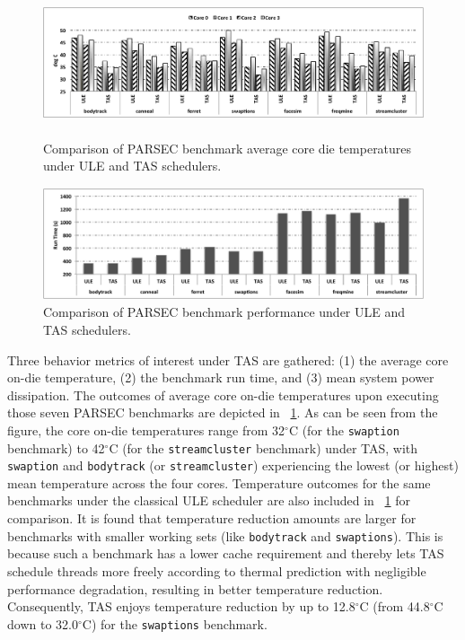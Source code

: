\documentclass[times, 10pt,twocolumn]{IEEEtran}
\begin{document}
\begin{figure}[tbp] 
\centering
  \includegraphics[width=1.0\linewidth,height=1.7in]{graphics/parsectemp}
  \caption{Comparison of PARSEC benchmark average core die temperatures
under ULE and TAS schedulers.}
  \label{fig:pbenchmarkt}
\end{figure}
\begin{figure}[tbp]
  \includegraphics[width=1.0\linewidth,height=1.3in]{graphics/parsecperformance}
  \caption{Comparison of PARSEC benchmark performance under ULE and TAS
schedulers.}
  \label{fig:pbenchmarkp}
\end{figure} 
Three behavior metrics of interest under TAS are gathered: (1) the
average core on-die temperature, (2) the benchmark run time, and (3)
mean system power dissipation.  The outcomes of average core on-die
temperatures upon executing those seven PARSEC benchmarks are depicted
in \figurename~\ref{fig:pbenchmarkt}.  As can be seen from the figure,
the core on-die temperatures range from 32$^\circ$C (for the
\texttt{swaption} benchmark) to 42$^\circ$C (for the
\texttt{streamcluster} benchmark)
under TAS, with \texttt{swaption} and \texttt{bodytrack} (or
\texttt{streamcluster}) experiencing the lowest (or highest) mean
temperature across the four cores.  Temperature outcomes for the same
benchmarks under the classical ULE scheduler are also included in
\figurename~\ref{fig:pbenchmarkt} for comparison.  It is found that
temperature reduction amounts are larger for benchmarks with smaller
working sets (like \texttt{bodytrack} and \texttt{swaptions}).  This is
because such a benchmark has a lower cache requirement \cite{Bienia2011}
and thereby lets TAS schedule threads more freely according to thermal
prediction with negligible performance degradation, resulting in better
temperature reduction.  Consequently, TAS enjoys temperature reduction
by up to 12.8$^{\circ}$C (from 44.8$^{\circ}$C down to
32.0$^{\circ}$C) for the \texttt{swaptions} benchmark.
  
\end{document}
